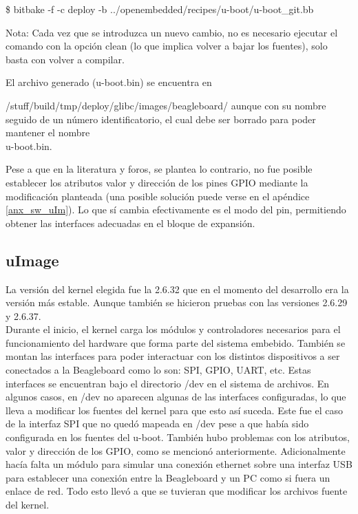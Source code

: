 \centerline{\$ bitbake -f -c deploy -b ../openembedded/recipes/u-boot/u-boot\_git.bb}

\bigskip
Nota: Cada vez que se introduzca un nuevo cambio, no es necesario ejecutar el comando con la opción clean (lo que implica volver a bajar los fuentes), solo basta con volver a compilar.

\bigskip
El archivo generado (u-boot.bin) se encuentra en 

/stuff/build/tmp/deploy/glibc/images/beagleboard/ aunque con su nombre seguido de un número identificatorio, el cual debe ser borrado para poder mantener el nombre\\
 u-boot.bin.

\bigskip
Pese a que en la literatura y foros, se plantea lo contrario, no fue posible establecer los atributos valor y dirección de los pines GPIO mediante la modificación planteada (una posible solución puede verse en el apéndice \ref{anx_sw_uIm}). Lo que sí cambia efectivamente es el modo del pin, permitiendo obtener las interfaces adecuadas en el bloque de expansión.

\subsection{uImage}
La versión del kernel elegida fue la 2.6.32 que en el momento del desarrollo era la versión más estable. Aunque también se hicieron pruebas con las versiones 2.6.29 y 2.6.37.\\
Durante el inicio, el kernel carga los módulos y controladores necesarios para el funcionamiento del 
hardware que forma parte del sistema embebido. También se montan las interfaces para poder interactuar con los distintos dispositivos a ser conectados a la Beagleboard como lo son: SPI, GPIO, UART, etc. Estas interfaces se encuentran bajo el directorio /dev en el sistema de archivos. En algunos casos, en /dev no aparecen algunas de las interfaces configuradas, lo que lleva a modificar los fuentes del kernel para que esto así suceda. Este fue el caso de la interfaz SPI que no quedó mapeada en /dev pese a que había sido configurada en los fuentes del u-boot. También hubo problemas con los atributos, valor y dirección de los GPIO, como se mencionó anteriormente. Adicionalmente hacía falta un módulo para simular una conexión ethernet sobre una interfaz USB para establecer una conexión entre la Beagleboard y un PC como si fuera un enlace de red. 
Todo esto llevó a que se tuvieran que modificar los archivos fuente del kernel.

